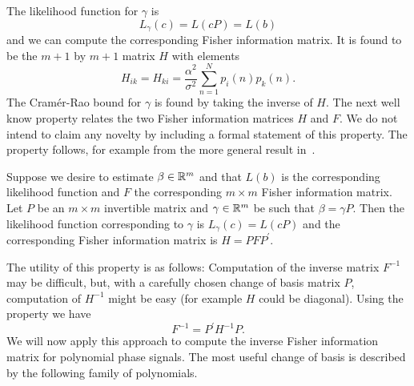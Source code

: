 \documentclass[journal,10pt]{IEEEtran}
\begin{document}
The likelihood function for $\gamma$ is 
\[
L_\gamma(c) = L(cP) = L(b)
\] 
and we can compute the corresponding Fisher information matrix.  It is found to be the $m+1$ by $m+1$ matrix $H$ with elements
\[
H_{ik} = H_{ki} = \frac{\alpha^2}{\sigma^2}\sum_{n=1}^{N} p_{i}(n) p_{k}(n).
\]
The Cram\'{e}r-Rao bound for $\gamma$ is found by taking the inverse of $H$.  The next well know property relates the two Fisher information matrices $H$ and $F$.  We do not intend to claim any novelty by including a formal statement of this property.  The property follows, for example from the more general result in~\cite[p. 45]{Kay1993_stat_sig_est_theory}.  %

\begin{property}
Suppose we desire to estimate $\beta \in {\mathbb R}^m$ and that $L(b)$ is the corresponding likelihood function and $F$ the corresponding $m \times m$ Fisher information matrix.  Let $P$ be an $m \times m$ invertible matrix and $\gamma \in {\mathbb R}^m$ be such that $\beta = \gamma P$.  Then the likelihood function corresponding to $\gamma$ is $L_\gamma(c) = L(cP)$ and the corresponding Fisher information matrix is $H = P F P^\prime$. 
\end{property}

The utility of this property is as follows:  Computation of the inverse matrix $F^{-1}$ may be difficult, but, with a carefully chosen change of basis matrix $P$, computation of $H^{-1}$ might be easy (for example $H$ could be diagonal).  Using the property we have 
\[
F^{-1} = P^\prime H^{-1} P.
\]  
We will now apply this approach to compute the inverse Fisher information matrix for polynomial phase signals.  The most useful change of basis is described by the following family of polynomials.
\end{document}
